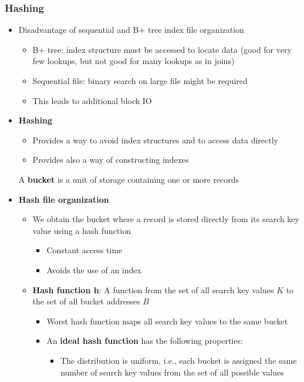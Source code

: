 \subsubsection{Hashing}
\begin{itemize}[label=\(\rhd\)]
    \item Disadvantage of sequential and B+ tree index file organization
    \begin{itemize}[label=\(\rhd\)]
        \item B+ tree: index structure must be accessed to locate data (good for very few lookups, but not good for many lookups as in joins)
        \item Sequential file: binary search on large file might be required
        \item This leads to additional block IO
    \end{itemize}
    \item \textbf{Hashing}
    \begin{itemize}[label=\(\rhd\)]
        \item Provides a way to avoid index structures and to access data directly 
        \item Provides also a way of constructing indexes
    \end{itemize}
    A \textbf{bucket} is a unit of storage containing one or more records
    \item \textbf{Hash file organization}
    \begin{itemize}[label=\(\rhd\)]
        \item We obtain the bucket where a record is stored directly from its search key value using a hash function
        \begin{itemize}[label=\(\rhd\)]
            \item Constant access time
            \item Avoids the use of an index
        \end{itemize}
        \item \textbf{Hash function h}: A function from the set of all search key values $K$ to the set of all bucket addresses $B$
        \begin{itemize}[label=\(\rhd\)]
            \item Worst hash function maps all search key values to the same bucket
            \item An \textbf{ideal hash function} has the following properties:
\begin{itemize}[label=\(\rhd\)]
    \item The distribution is uniform, i.e., each bucket is assigned the same number of search key values from the set of all possible values

\end{itemize}
\end{itemize}
\end{itemize}
\end{itemize}
